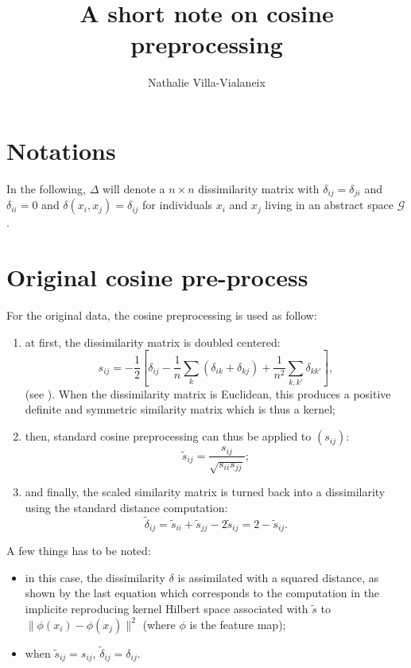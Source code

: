 \documentclass[a4paper,10pt]{scrartcl}
\title{A short note on cosine preprocessing}
\author{Nathalie Villa-Vialaneix}
\begin{document}
\sloppy
\maketitle

\section{Notations}

In the following, $\Delta$ will denote a $n\times n$ dissimilarity matrix with
$\delta_{ij}=\delta_{ji}$ and $\delta_{ii}=0$ and $\delta(x_i,x_j)=\delta_{ij}$
for individuals $x_i$ and $x_j$ living in an abstract space $\mathcal{G}$.

\section{Original cosine pre-process}

For the original data, the cosine preprocessing is used as follow:
\begin{enumerate}
	\item at first, the dissimilarity matrix is doubled centered:
	\[
		s_{ij} = -\frac{1}{2} \left[\delta_{ij} -\frac{1}{n} \sum_k
\left(\delta_{ik}+\delta_{kj}\right) + \frac{1}{n^2} \sum_{k,k'}
\delta_{kk'}\right],
	\]
	(see \cite{lee_verleysen_NDR2007}). When the dissimilarity matrix is
Euclidean, this produces a positive definite and symmetric similarity matrix
which is thus a kernel;
	\item then, standard cosine preprocessing \cite{benhur_weston_DMTLS2010} can
thus be applied to $(s_{ij})$:
	\[
		\tilde{s}_{ij} = \frac{s_{ij}}{\sqrt{s_{ii}s_{jj}}};
	\]
	\item and finally, the scaled similarity matrix is turned back into a
dissimilarity using the standard distance computation:
	\[
		\tilde{\delta}_{ij} = \tilde{s}_{ii} + \tilde{s}_{jj} - 2\tilde{s}_{ij} =
2-\tilde{s}_{ij}.
	\]
\end{enumerate}

A few things has to be noted:
\begin{itemize}
	\item in this case, the dissimilarity $\delta$ is assimilated with a squared
distance, as shown by the last equation which corresponds to the computation in
the implicite reproducing kernel Hilbert space associated with $\tilde{s}$ to
$\|\phi(x_i)-\phi(x_j)\|^2$ (where $\phi$ is the feature map);
	\item when $\tilde{s}_{ij}=s_{ij}$, $\tilde{\delta}_{ij}=\delta_{ij}$.
\end{itemize}
\end{document}
